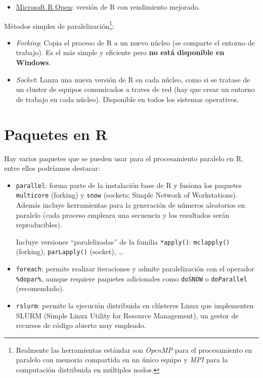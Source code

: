 \documentclass[
]{book}
\providecommand{\tightlist}{%
  \setlength{\itemsep}{0pt}\setlength{\parskip}{0pt}}
\theoremstyle{definition}
\theoremstyle{definition}
\theoremstyle{definition}
\theoremstyle{remark}
\begin{document}
\begin{itemize}
\tightlist
\item
  \href{https://mran.revolutionanalytics.com}{Microsoft R Open}: versión de R con rendimiento mejorado.
\end{itemize}

Métodos simples de paralelización\footnote{Realmente las herramientas estándar son
  \emph{OpenMP} para el procesamiento en paralelo con memoria compartida en un único equipo
  y \emph{MPI} para la computación distribuida en múltiples nodos.}:

\begin{itemize}
\item
  \emph{Forking}: Copia el proceso de R a un nuevo núcleo (se comparte el entorno de trabajo).
  Es el más simple y eficiente pero \textbf{no está disponible en Windows}.
\item
  \emph{Socket}: Lanza una nueva versión de R en cada núcleo, como si se tratase de un cluster
  de equipos comunicados a traves de red (hay que crear un entorno de trabajo en cada núcleo).
  Disponible en todos los sistemas operativos.
\end{itemize}

\hypertarget{paquetes-en-r}{%
\section{Paquetes en R}\label{paquetes-en-r}}

Hay varios paquetes que se pueden usar para el procesamiento paralelo en R,
entre ellos podríamos destacar:

\begin{itemize}
\item
  \texttt{parallel}: forma parte de la instalación base de R y fusiona los paquetes
  \texttt{multicore} (forking) y \texttt{snow} (sockets; Simple Network of Workstations).
  Además incluye herramientas para la generación de números aleatorios en paralelo
  (cada proceso empleara una secuencia y los resultados serán reproducibles).

  Incluye versiones ``paralelizadas'' de la familia \texttt{*apply()}:
  \texttt{mclapply()} (forking), \texttt{parLapply()} (socket), \ldots{}
\item
  \texttt{foreach}: permite realizar iteraciones y admite paralelización con el operador \texttt{\%dopar\%},
  aunque requiere paquetes adicionales como \texttt{doSNOW} o \texttt{doParallel} (recomendado).
\item
  \texttt{rslurm}: permite la ejecución distribuida en clústeres Linux que implementen
  SLURM (Simple Linux Utility for Resource Management),
  un gestor de recursos de código abierto muy empleado.
\end{itemize}
\end{document}
